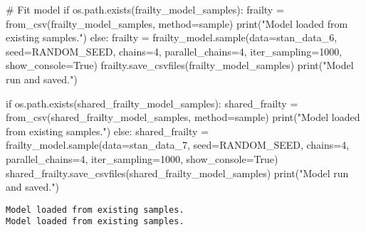 \documentclass[
  letterpaper,
  DIV=11,
  numbers=noendperiod]{scrartcl}
\newenvironment{Shaded}{\begin{snugshade}}{\end{snugshade}}
\newcommand{\BuiltInTok}[1]{\textcolor[rgb]{0.00,0.23,0.31}{#1}}
\newcommand{\CommentTok}[1]{\textcolor[rgb]{0.37,0.37,0.37}{#1}}
\newcommand{\ControlFlowTok}[1]{\textcolor[rgb]{0.00,0.23,0.31}{#1}}
\newcommand{\DecValTok}[1]{\textcolor[rgb]{0.68,0.00,0.00}{#1}}
\newcommand{\NormalTok}[1]{\textcolor[rgb]{0.00,0.23,0.31}{#1}}
\newcommand{\OperatorTok}[1]{\textcolor[rgb]{0.37,0.37,0.37}{#1}}
\newcommand{\StringTok}[1]{\textcolor[rgb]{0.13,0.47,0.30}{#1}}
\newcommand{\VariableTok}[1]{\textcolor[rgb]{0.07,0.07,0.07}{#1}}
\begin{document}
\begin{Shaded}
\begin{Highlighting}[]
\CommentTok{\# Fit model}
\ControlFlowTok{if}\NormalTok{ os.path.exists(frailty\_model\_samples):}
\NormalTok{    frailty }\OperatorTok{=}\NormalTok{ from\_csv(frailty\_model\_samples, method}\OperatorTok{=}\StringTok{\textquotesingle{}sample\textquotesingle{}}\NormalTok{)}
    \BuiltInTok{print}\NormalTok{(}\StringTok{"Model loaded from existing samples."}\NormalTok{)}
\ControlFlowTok{else}\NormalTok{:}
\NormalTok{    frailty }\OperatorTok{=}\NormalTok{ frailty\_model.sample(data}\OperatorTok{=}\NormalTok{stan\_data\_6, seed}\OperatorTok{=}\NormalTok{RANDOM\_SEED, chains}\OperatorTok{=}\DecValTok{4}\NormalTok{, parallel\_chains}\OperatorTok{=}\DecValTok{4}\NormalTok{, iter\_sampling}\OperatorTok{=}\DecValTok{1000}\NormalTok{, show\_console}\OperatorTok{=}\VariableTok{True}\NormalTok{)}
\NormalTok{    frailty.save\_csvfiles(frailty\_model\_samples)}
    \BuiltInTok{print}\NormalTok{(}\StringTok{"Model run and saved."}\NormalTok{)}

\ControlFlowTok{if}\NormalTok{ os.path.exists(shared\_frailty\_model\_samples):}
\NormalTok{    shared\_frailty }\OperatorTok{=}\NormalTok{ from\_csv(shared\_frailty\_model\_samples, method}\OperatorTok{=}\StringTok{\textquotesingle{}sample\textquotesingle{}}\NormalTok{)}
    \BuiltInTok{print}\NormalTok{(}\StringTok{"Model loaded from existing samples."}\NormalTok{)}
\ControlFlowTok{else}\NormalTok{:}
\NormalTok{    shared\_frailty }\OperatorTok{=}\NormalTok{ frailty\_model.sample(data}\OperatorTok{=}\NormalTok{stan\_data\_7, seed}\OperatorTok{=}\NormalTok{RANDOM\_SEED, chains}\OperatorTok{=}\DecValTok{4}\NormalTok{, parallel\_chains}\OperatorTok{=}\DecValTok{4}\NormalTok{, iter\_sampling}\OperatorTok{=}\DecValTok{1000}\NormalTok{, show\_console}\OperatorTok{=}\VariableTok{True}\NormalTok{)}
\NormalTok{    shared\_frailty.save\_csvfiles(shared\_frailty\_model\_samples)}
    \BuiltInTok{print}\NormalTok{(}\StringTok{"Model run and saved."}\NormalTok{)}
\end{Highlighting}
\end{Shaded}

\begin{verbatim}
Model loaded from existing samples.
Model loaded from existing samples.
\end{verbatim}
\end{document}
